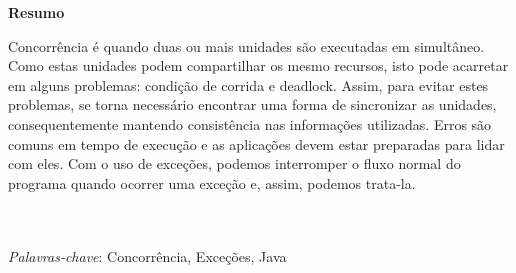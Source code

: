 {
\Large
\begin{center}
\textbf{Resumo}
\end{center}
}

Concorrência é quando duas ou mais unidades são executadas em
simultâneo. Como estas unidades podem compartilhar os mesmo recursos, isto
pode acarretar em alguns problemas: condição de corrida e deadlock. Assim,
para evitar estes problemas, se torna necessário encontrar uma forma
de sincronizar as unidades, consequentemente mantendo consistência nas
informações utilizadas.  Erros são comuns em tempo de execução e as
aplicações devem estar preparadas para lidar com eles.  Com o uso de
exceções, podemos interromper o fluxo normal do programa quando ocorrer
uma exceção e, assim, podemos trata-la.

\quad\\
\quad\\
\textit{Palavras-chave}: Concorrência, Exceções, Java

\pagebreak
